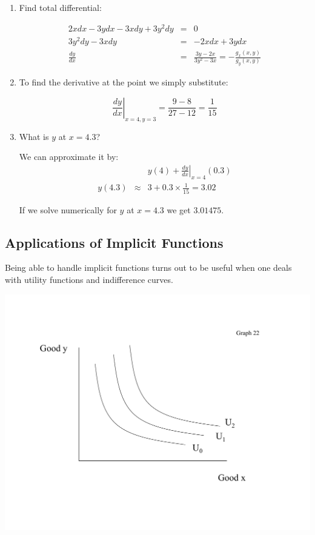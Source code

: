 \documentclass[11pt,english]{article}
\begin{document}
\begin{enumerate}
\item Find total differential:

\begin{eqnarray*}
2xdx-3ydx-3xdy+3y^{2}dy &=&0 \\
3y^{2}dy-3xdy &=&-2xdx+3ydx \\
\frac{dy}{dx} &=&\frac{3y-2x}{3y^{2}-3x}=-\frac{g_x(x,y)}{g_y(x,y)}
\end{eqnarray*}

\item To find the derivative at the point we simply substitute:

\begin{equation*}
\left. \frac{dy}{dx}\right| _{x=4,y=3}=\frac{9-8}{27-12}=\frac{1}{15}
\end{equation*}

\item What is $y$ at $x=4.3$?

We can approximate it by: 
\begin{eqnarray*}
&&y(4)+\left. \frac{dy}{dx}\right| _{x=4}(0.3) \\
y(4.3) &\approx &3+0.3\times \frac{1}{15}=3.02
\end{eqnarray*}

If we solve numerically for $y$ at $x=4.3$ we get $3.01475$.
\end{enumerate}

\bigskip

\subsection{Applications of Implicit Functions}

Being able to handle implicit functions turns out to be useful when one
deals with utility functions and indifference curves.

\includegraphics[scale=0.6]{math8.pdf}
\end{document}

